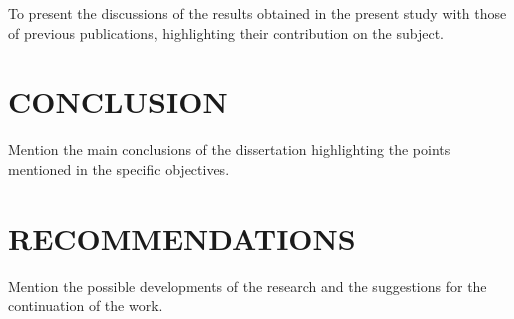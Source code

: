 To present the discussions of the results obtained in the present study with those of previous publications, highlighting their contribution on the subject.

\chapter{CONCLUSION}

Mention the main conclusions of the dissertation highlighting the points mentioned in the specific objectives.

\chapter{RECOMMENDATIONS}

Mention the possible developments of the research and the suggestions for the continuation of the work.